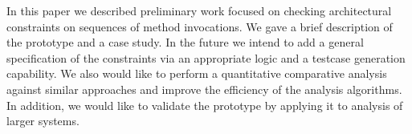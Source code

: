 \documentclass{acm_proc_article-sp}
\begin{document}
In this paper we described preliminary work focused on checking architectural constraints on sequences of method invocations. We gave a brief description of the prototype and a case study.
In the future we intend to add a general specification of the constraints via an appropriate logic and a testcase generation capability.
We also would like to perform a quantitative comparative analysis against similar approaches and improve the efficiency of the analysis algorithms.
In addition, we would like to validate the prototype by applying it to analysis of larger systems.



%



\balancecolumns
\end{document}
